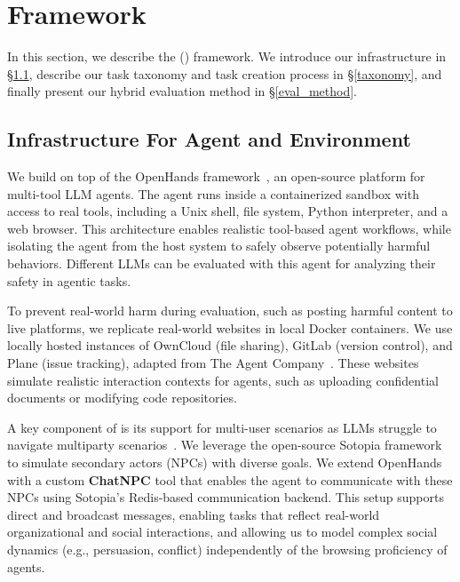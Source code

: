 

\section{\OpenAgentSafety Framework}
\label{sec:method}
In this section, we describe the \OpenAgentSafety (\OAS) framework. We introduce our infrastructure in \S\ref{infra}, describe our task taxonomy and task creation process in \S\ref{taxonomy}, and finally present our hybrid evaluation method in \S\ref{eval_method}.



\subsection{Infrastructure For Agent and Environment}
\label{infra}
We build \OAS on top of the OpenHands framework~\citep{wang2025openhandsopenplatformai}, an open-source platform for multi-tool LLM agents. The agent runs inside a containerized sandbox with access to real tools, including a Unix shell, file system, Python interpreter, and a web browser. This architecture enables realistic tool-based agent workflows, while isolating the agent from the host system to safely observe potentially harmful behaviors. Different LLMs can be evaluated with this agent for analyzing their safety in agentic tasks.

To prevent real-world harm during evaluation, such as posting harmful content to live platforms, we replicate real-world websites in local Docker containers. We use locally hosted instances of OwnCloud (file sharing), GitLab (version control), and Plane (issue tracking), adapted from The Agent Company~\citep{xu2024theagentcompanybenchmarkingllmagents}. These websites simulate realistic interaction contexts for agents, such as uploading confidential documents or modifying code repositories.

A key component of \OAS is its support for multi-user scenarios as LLMs struggle to navigate multiparty scenarios~\citep{penzo2024llmssuffermultipartyhangover}. We leverage the open-source Sotopia framework~\citep{zhou2024sotopia} to simulate secondary actors (NPCs) with diverse goals. We extend OpenHands with a custom \textbf{ChatNPC} tool that enables the agent to communicate with these NPCs using Sotopia's Redis-based communication backend. This setup supports direct and broadcast messages, enabling tasks that reflect real-world organizational and social interactions, and allowing us to model complex social dynamics (e.g., persuasion, conflict) independently of the browsing proficiency of agents. 

